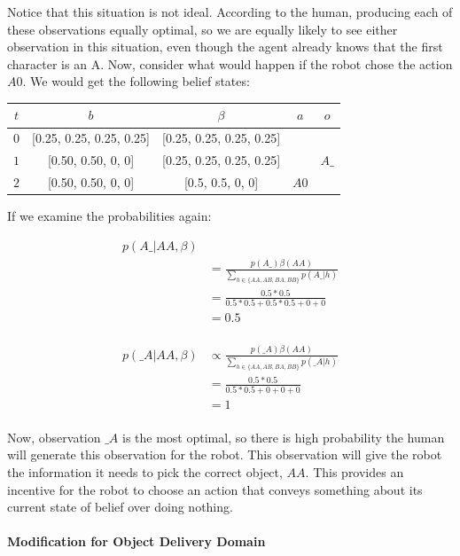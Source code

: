\documentclass[conference]{IEEEtran}
\begin{document}
Notice that this situation is not ideal. According to the human, producing each of these observations equally optimal, so we are equally likely to see either observation in this situation, even though the agent already knows that the first character is an A. Now, consider what would happen if the robot chose the action $A0$. We would get the following belief states: 


\begin{center}
	\footnotesize
\begin{tabular}{|c| c| c| c | c|}
	\hline
	$t$ & $b$ & $\beta$ & $a$ & $o$ \\
	\hline
	$0$ & [0.25, 0.25, 0.25, 0.25] & [0.25, 0.25, 0.25, 0.25] & & \\
	\hline
	$1$ & [0.50, 0.50, 0, 0] & [0.25, 0.25, 0.25, 0.25] & & $A\_$ \\
	\hline
	$2$ & [0.50, 0.50, 0, 0] & [0.5, 0.5, 0, 0] & $A0$  &  \\
	\hline
\end{tabular}
\end{center}

If we examine the probabilities again: 

\begin{align*}
	p(A\_|AA, \beta) & \\
	&= \frac{ p(A\_)\beta(AA) }{ \sum_{h \in \{AA, AB, BA, BB\}} p(A\_ | h) } \\
	&= \frac{0.5 * 0.5}{0.5 * 0.5 + 0.5 * 0.5 + 0 + 0} \\
	&= 0.5 \\
\end{align*}

\begin{align*}
	p(\_A|AA, \beta) &\propto \frac{ p(\_A)\beta(AA) }{ \sum_{h \in \{AA, AB, BA, BB\}} p(\_A | h) } \\
	&= \frac{0.5 * 0.5}{0.5 * 0.5 + 0 + 0 + 0} \\
	&= 1 \\
\end{align*}


Now, observation $\_A$ is the most optimal, so there is high probability the human will generate this observation for the robot. This observation will give the robot the information it needs to pick the correct object, $AA$. This provides an incentive for the robot to choose an action that conveys something about its current state of belief over doing nothing. 

\paragraph{Modification for Object Delivery Domain}
\end{document}
